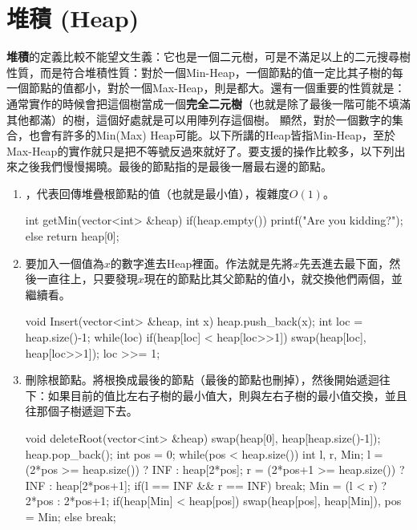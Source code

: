 \section{堆積 (Heap)}
\textbf{堆積}的定義比較不能望文生義：它也是一個二元樹，可是不滿足以上的二元搜尋樹性質，而是符合堆積性質：對於一個Min-Heap，一個節點的值一定比其子樹的每一個節點的值都小，對於一個Max-Heap，則是都大。還有一個重要的性質就是：通常實作的時候會把這個樹當成一個\textbf{完全二元樹}（也就是除了最後一階可能不填滿其他都滿）的樹，這個好處就是可以用陣列存這個樹。
顯然，對於一個數字的集合，也會有許多的Min(Max) Heap可能。以下所講的Heap皆指Min-Heap，至於Max-Heap的實作就只是把不等號反過來就好了。要支援的操作比較多，以下列出來之後我們慢慢揭曉。最後的節點指的是最後一層最右邊的節點。
\begin{enumerate}
\item {}，代表回傳堆疊根節點的值（也就是最小值），複雜度$O(1)$。
\begin{C++}
int getMin(vector<int> &heap) {
    if(heap.empty())
        printf("Are you kidding?\n");
    else return heap[0];
}
\end{C++}
\item {} 要加入一個值為$x$的數字進去Heap裡面。作法就是先將$x$先丟進去最下面，然後一直往上，只要發現$x$現在的節點比其父節點的值小，就交換他們兩個，並繼續看。
\begin{C++}
void Insert(vector<int> &heap, int x) {
    heap.push_back(x);
    int loc = heap.size()-1;
    while(loc){
        if(heap[loc] < heap[loc>>1])
            swap(heap[loc], heap[loc>>1]);
        loc >>= 1;
    }
}
\end{C++}
\item {} 刪除根節點。將根換成最後的節點（最後的節點也刪掉），然後開始遞迴往下：如果目前的值比左右子樹的最小值大，則與左右子樹的最小值交換，並且往那個子樹遞迴下去。
\begin{C++}
void deleteRoot(vector<int> &heap) {
    swap(heap[0], heap[heap.size()-1]);
    heap.pop_back();
    int pos = 0;
    while(pos < heap.size()) {
        int l, r, Min;
        l = (2*pos >= heap.size()) ?
        	INF : heap[2*pos];
        r = (2*pos+1 >= heap.size()) ?
        	INF : heap[2*pos+1];
        if(l == INF && r == INF) break;
        Min = (l < r) ? 2*pos : 2*pos+1;
        if(heap[Min] < heap[pos])
            swap(heap[pos], heap[Min]), pos = Min;
        else break;
    }
}
\end{C++}
\end{enumerate}
